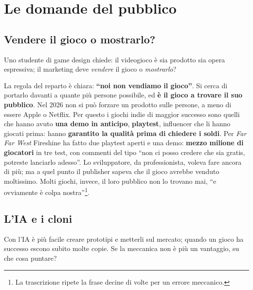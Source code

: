 \section{Le domande del pubblico}
\label{sec:c2-1-domande}

\subsection{Vendere il gioco o mostrarlo?}

Uno studente di game design chiede: il videogioco è sia prodotto sia opera
espressiva; il marketing deve \emph{vendere} il gioco o \emph{mostrarlo}?

La regola del reparto è chiara: \textbf{``noi non vendiamo il gioco''}. Si cerca di
portarlo davanti a quante più persone possibile, ed \textbf{è il gioco a trovare
il suo pubblico}. Nel 2026 non si può forzare un prodotto sulle persone, a meno di
essere Apple o Netflix. Per questo i giochi indie di maggior successo sono quelli
che hanno avuto \textbf{una demo in anticipo}, \textbf{playtest}, influencer che li
hanno giocati prima: hanno \textbf{garantito la qualità prima di chiedere i
soldi}. Per \emph{Far Far West} Fireshine ha fatto due playtest aperti e una demo:
\textbf{mezzo milione di giocatori} in tre test, con commenti del tipo ``non ci
posso credere che sia gratis, potreste lanciarlo adesso''. Lo sviluppatore, da
professionista, voleva fare ancora di più; ma a quel punto il publisher sapeva che
il gioco avrebbe venduto moltissimo. Molti giochi, invece, il loro pubblico non lo
trovano mai, ``e ovviamente è colpa nostra''\footnote{La trascrizione ripete la
frase decine di volte per un errore meccanico.}.

\subsection{L'IA e i cloni}

Con l'IA è più facile creare prototipi e metterli sul mercato; quando un gioco ha
successo escono subito molte copie. Se la meccanica non è più un vantaggio, su che
cosa puntare?

